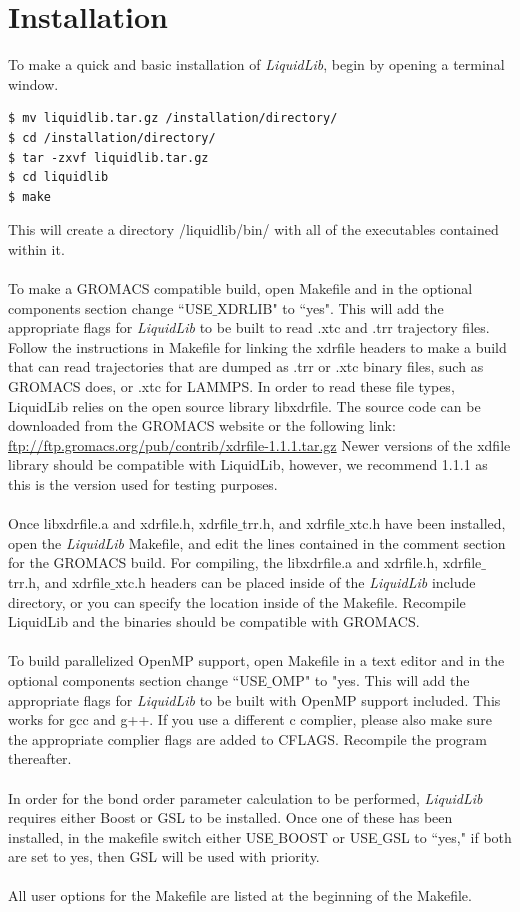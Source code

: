 \documentclass{article}
\begin{document}
\section{Installation}
To make a quick and basic installation of \textit{LiquidLib}, begin by opening a terminal window.
\begin{lstlisting}[style=BashInputStyle]
$ mv liquidlib.tar.gz /installation/directory/
$ cd /installation/directory/
$ tar -zxvf liquidlib.tar.gz
$ cd liquidlib
$ make
\end{lstlisting}
This will create a directory /liquidlib/bin/ with all of the executables contained within it.
\\
\\
To make a GROMACS compatible build, open Makefile and in the optional components section change ``USE$\_$XDRLIB" to ``yes".  This will add the appropriate flags for \textit{LiquidLib} to be built to read .xtc and .trr trajectory files.  Follow the instructions in Makefile for linking the xdrfile headers to make a build that can read trajectories that are dumped as .trr or .xtc binary files, such as GROMACS does, or .xtc for LAMMPS.  In order to read these file types, LiquidLib relies on the open source library libxdrfile.  The source code can be downloaded from the GROMACS website or the following link: \url{ftp://ftp.gromacs.org/pub/contrib/xdrfile-1.1.1.tar.gz} Newer versions of the xdfile library should be compatible with LiquidLib, however, we recommend 1.1.1 as this is the version used for testing purposes.
\\
\\
Once libxdrfile.a and xdrfile.h, xdrfile$\_$trr.h, and xdrfile$\_$xtc.h have been installed, open the \textit{LiquidLib} Makefile, and edit the lines contained in the comment section for the GROMACS build.  For compiling, the libxdrfile.a and xdrfile.h, xdrfile$\_$trr.h, and xdrfile$\_$xtc.h headers can be placed inside of the \textit{LiquidLib} include directory, or you can specify the location inside of the Makefile.  Recompile LiquidLib and the binaries should be compatible with GROMACS.
\\
\\
To build parallelized OpenMP support, open Makefile in a text editor and in the optional components section change ``USE$\_$OMP" to "yes.  This will add the appropriate flags for \textit{LiquidLib} to be built with OpenMP support included.  This works for gcc and g++. If you use a different c complier, please also make sure the appropriate complier flags are added to CFLAGS. Recompile the program thereafter.
\\
\\
In order for the bond order parameter calculation to be performed, \textit{LiquidLib} requires either Boost or GSL to be installed.  Once one of these has been installed, in the makefile switch either USE$\_$BOOST or USE$\_$GSL to ``yes," if both are set to yes, then GSL will be used with priority.
\\
\\
All user options for the Makefile are listed at the beginning of the Makefile.
\end{document}
